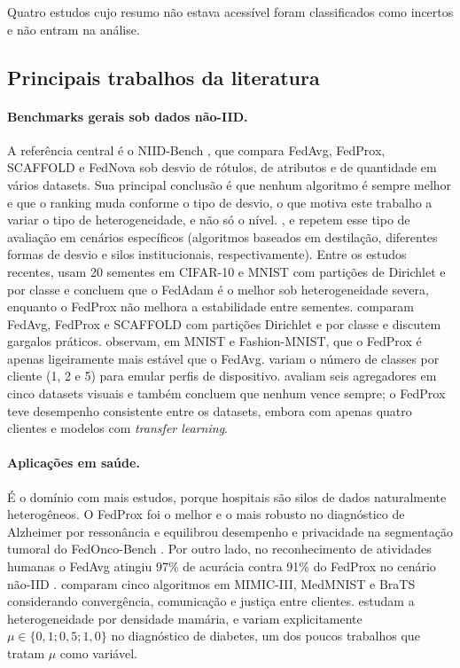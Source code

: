 Quatro estudos cujo resumo não estava acessível foram classificados como incertos e não entram na análise.

\subsection{Principais trabalhos da literatura}

\paragraph{Benchmarks gerais sob dados não-IID.}
A referência central é o NIID-Bench \citep{li2022niidbench}, que compara FedAvg, FedProx, SCAFFOLD e FedNova \citep{wang2020fednova} sob desvio de rótulos, de atributos e de quantidade em vários datasets. Sua principal conclusão é que nenhum algoritmo é sempre melhor e que o ranking muda conforme o tipo de desvio, o que motiva este trabalho a variar o tipo de heterogeneidade, e não só o nível. \citet{mora2022empirical}, \citet{nascimento2024dataskew} e \citet{delehouzee2024crosssilo} repetem esse tipo de avaliação em cenários específicos (algoritmos baseados em destilação, diferentes formas de desvio e silos institucionais, respectivamente). Entre os estudos recentes, \citet{enang2026optimiser} usam 20 sementes em CIFAR-10 e MNIST com partições de Dirichlet e por classe e concluem que o FedAdam é o melhor sob heterogeneidade severa, enquanto o FedProx não melhora a estabilidade entre sementes. \citet{ikram2026empirical} comparam FedAvg, FedProx e SCAFFOLD com partições Dirichlet e por classe e discutem gargalos práticos. \citet{sevinc2025distribution} observam, em MNIST e Fashion-MNIST, que o FedProx é apenas ligeiramente mais estável que o FedAvg. \citet{ananouch2025optimization} variam o número de classes por cliente (1, 2 e 5) para emular perfis de dispositivo. \citet{onlu2025aggregation} avaliam seis agregadores em cinco datasets visuais e também concluem que nenhum vence sempre; o FedProx teve desempenho consistente entre os datasets, embora com apenas quatro clientes e modelos com \textit{transfer learning}.

\paragraph{Aplicações em saúde.}
É o domínio com mais estudos, porque hospitais são silos de dados naturalmente heterogêneos. O FedProx foi o melhor e o mais robusto no diagnóstico de Alzheimer por ressonância \citep{mahmood2025alzheimer} e equilibrou desempenho e privacidade na segmentação tumoral do FedOnco-Bench \citep{marella2025fedonco}. Por outro lado, no reconhecimento de atividades humanas o FedAvg atingiu 97\% de acurácia contra 91\% do FedProx no cenário não-IID \citep{vajjhula2025har}. \citet{mim2025healthcare} comparam cinco algoritmos em MIMIC-III, MedMNIST e BraTS considerando convergência, comunicação e justiça entre clientes. \citet{quintana2026mammography} estudam a heterogeneidade por densidade mamária, e \citet{tekrour2026diabetes} variam explicitamente $\mu \in \{0{,}1; 0{,}5; 1{,}0\}$ no diagnóstico de diabetes, um dos poucos trabalhos que tratam $\mu$ como variável.

